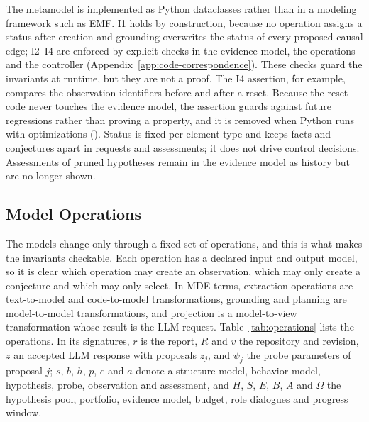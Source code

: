\documentclass[a4paper,fleqn]{cas-sc}
\newcommand{\code}[1]{\texttt{\detokenize{#1}}}
\begin{document}
The metamodel is implemented as Python dataclasses rather than in a modeling framework such as EMF. I1 holds by construction, because no operation assigns a status after creation and grounding overwrites the status of every proposed causal edge; I2--I4 are enforced by explicit checks in the evidence model, the operations and the controller (Appendix~\ref{app:code-correspondence}). These checks guard the invariants at runtime, but they are not a proof. The I4 assertion, for example, compares the observation identifiers before and after a reset. Because the reset code never touches the evidence model, the assertion guards against future regressions rather than proving a property, and it is removed when Python runs with optimizations (\code{-O}). Status is fixed per element type and keeps facts and conjectures apart in requests and assessments; it does not drive control decisions. Assessments of pruned hypotheses remain in the evidence model as history but are no longer shown.

\subsection{Model Operations}\label{sec:operations}
The models change only through a fixed set of operations, and this is what makes the invariants checkable. Each operation has a declared input and output model, so it is clear which operation may create an observation, which may only create a conjecture and which may only select. In MDE terms, extraction operations are text-to-model and code-to-model transformations, grounding and planning are model-to-model transformations, and projection is a model-to-view transformation whose result is the LLM request. Table~\ref{tab:operations} lists the operations. In its signatures, $r$ is the report, $R$ and $v$ the repository and revision, $z$ an accepted LLM response with proposals $z_j$, and $\psi_j$ the probe parameters of proposal $j$; $s$, $b$, $h$, $p$, $e$ and $a$ denote a structure model, behavior model, hypothesis, probe, observation and assessment, and $H$, $S$, $E$, $B$, $A$ and $\Omega$ the hypothesis pool, portfolio, evidence model, budget, role dialogues and progress window.
\end{document}
